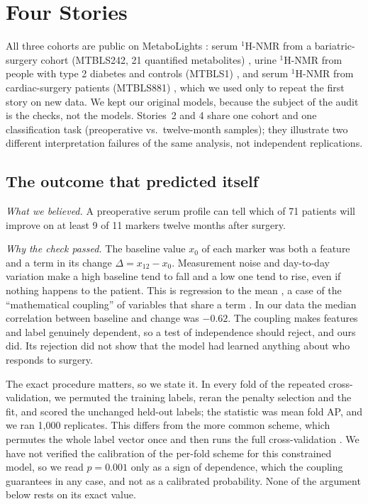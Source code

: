 \documentclass[conference]{IEEEtran}
\begin{document}
\section{Four Stories}
\label{sec:stories}

All three cohorts are public on MetaboLights \cite{haug2020}: serum
$^1$H-NMR from a bariatric-surgery cohort (MTBLS242, 21 quantified
metabolites) \cite{mtbls242, gralka2015}, urine $^1$H-NMR from people with
type 2 diabetes and controls (MTBLS1) \cite{salek2007}, and serum $^1$H-NMR
from cardiac-surgery patients (MTBLS881) \cite{maltesen2020}, which we used
only to repeat the first story on new data. We kept our original models,
because the subject of the audit is the checks, not the models. Stories~2
and 4 share one cohort and one classification task (preoperative vs.\
twelve-month samples); they illustrate two different interpretation
failures of the same analysis, not independent replications.

\subsection{The outcome that predicted itself}
\label{sec:story1}

\emph{What we believed.} A preoperative serum profile can tell which of 71
patients will improve on at least 9 of 11 markers twelve months after
surgery.

\emph{Why the check passed.} The baseline value $x_0$ of each marker was both
a feature and a term in its change $\Delta = x_{12}-x_0$. Measurement noise
and day-to-day variation make a high baseline tend to fall and a low one tend
to rise, even if nothing happens to the patient. This is regression to the
mean \cite{barnett2005, tu2007}, a case of the ``mathematical coupling'' of
variables that share a term \cite{archie1981}. In our data the median
correlation between baseline and change was $-0.62$. The coupling makes
features and label genuinely dependent, so a test of independence should
reject, and ours did. Its rejection did not show that the model had learned
anything about who responds to surgery.

The exact procedure matters, so we state it. In every fold of the repeated
cross-validation, we permuted the training labels, reran the penalty
selection and the fit, and scored the unchanged held-out labels; the
statistic was mean fold AP, and we ran 1{,}000 replicates. This differs from
the more common scheme, which permutes the whole label vector once and then
runs the full cross-validation \cite{ojala2010}. We have not verified the
calibration of the per-fold scheme for this constrained model, so we read
$p=0.001$ only as a sign of dependence, which the coupling guarantees in any
case, and not as a calibrated probability. None of the argument below rests
on its exact value.
\end{document}
